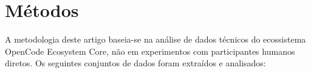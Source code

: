 \documentclass[12pt,a4paper]{article}
\begin{document}
\section{Métodos}

A metodologia deste artigo baseia-se na análise de dados técnicos do ecossistema OpenCode Ecosystem Core, não em experimentos com participantes humanos diretos. Os seguintes conjuntos de dados foram extraídos e analisados:






\end{document}
